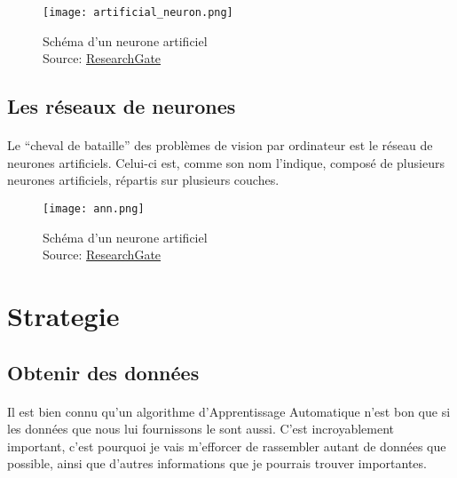 \begin{figure}[H]
    \centering
    \texttt{[image: artificial\_neuron.png]}
    \caption{Schéma d'un neurone artificiel\\Source: \href{https://www.researchgate.net/figure/Scheme-of-a-perceptron-A-nonlinear-activation-function-BULLET-is-applied-to-the_fig3_315788933}{ResearchGate}}
\end{figure}


\subsection{Les réseaux de neurones}
\paragraph{}
Le ``cheval de bataille'' des problèmes de vision par ordinateur est le réseau de neurones artificiels.
Celui-ci est, comme son nom l'indique, composé de plusieurs neurones artificiels, répartis sur plusieurs couches.

\begin{figure}[H]
    \centering
    \texttt{[image: ann.png]}
    \caption{Schéma d'un neurone artificiel\\Source: \href{https://www.researchgate.net/figure/Deep-learning-diagram_fig5_323784695}{ResearchGate}}
\end{figure}

\section{Strategie}

\subsection{Obtenir des données}
\paragraph{}
Il est bien connu qu'un algorithme d'Apprentissage Automatique n'est bon que si les données que nous lui fournissons le sont aussi.
C'est incroyablement important, c'est pourquoi je vais m'efforcer de rassembler autant de données que possible, ainsi que d'autres informations que je pourrais trouver importantes.

